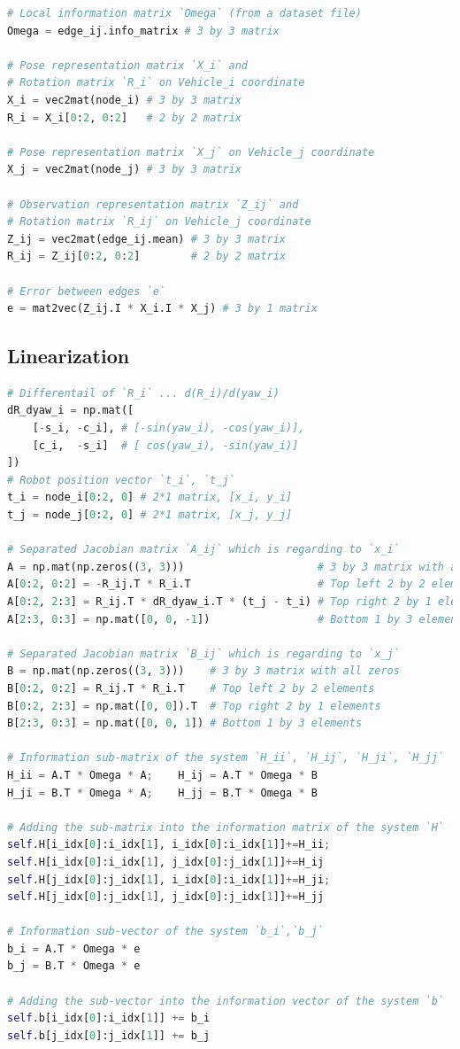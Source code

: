 \documentclass{article}
\begin{document}
\begin{lstlisting}[language=python]
# Local information matrix `Omega` (from a dataset file)
Omega = edge_ij.info_matrix # 3 by 3 matrix

# Pose representation matrix `X_i` and
# Rotation matrix `R_i` on Vehicle_i coordinate
X_i = vec2mat(node_i) # 3 by 3 matrix
R_i = X_i[0:2, 0:2]   # 2 by 2 matrix

# Pose representation matrix `X_j` on Vehicle_j coordinate
X_j = vec2mat(node_j) # 3 by 3 matrix

# Observation representation matrix `Z_ij` and
# Rotation matrix `R_ij` on Vehicle_j coordinate
Z_ij = vec2mat(edge_ij.mean) # 3 by 3 matrix
R_ij = Z_ij[0:2, 0:2]        # 2 by 2 matrix

# Error between edges `e`
e = mat2vec(Z_ij.I * X_i.I * X_j) # 3 by 1 matrix
\end{lstlisting}

\subsection{Linearization}

\begin{lstlisting}[language=python]
# Differentail of `R_i` ... d(R_i)/d(yaw_i)
dR_dyaw_i = np.mat([
    [-s_i, -c_i], # [-sin(yaw_i), -cos(yaw_i)],
    [c_i,  -s_i]  # [ cos(yaw_i), -sin(yaw_i)]
])
# Robot position vector `t_i`, `t_j`
t_i = node_i[0:2, 0] # 2*1 matrix, [x_i, y_i]
t_j = node_j[0:2, 0] # 2*1 matrix, [x_j, y_j]

# Separated Jacobian matrix `A_ij` which is regarding to `x_i`
A = np.mat(np.zeros((3, 3)))                     # 3 by 3 matrix with all zeros
A[0:2, 0:2] = -R_ij.T * R_i.T                    # Top left 2 by 2 elements
A[0:2, 2:3] = R_ij.T * dR_dyaw_i.T * (t_j - t_i) # Top right 2 by 1 elements
A[2:3, 0:3] = np.mat([0, 0, -1])                 # Bottom 1 by 3 elements

# Separated Jacobian matrix `B_ij` which is regarding to `x_j`
B = np.mat(np.zeros((3, 3)))    # 3 by 3 matrix with all zeros
B[0:2, 0:2] = R_ij.T * R_i.T    # Top left 2 by 2 elements
B[0:2, 2:3] = np.mat([0, 0]).T  # Top right 2 by 1 elements
B[2:3, 0:3] = np.mat([0, 0, 1]) # Bottom 1 by 3 elements

# Information sub-matrix of the system `H_ii`, `H_ij`, `H_ji`, `H_jj`
H_ii = A.T * Omega * A;    H_ij = A.T * Omega * B
H_ji = B.T * Omega * A;    H_jj = B.T * Omega * B

# Adding the sub-matrix into the information matrix of the system `H`
self.H[i_idx[0]:i_idx[1], i_idx[0]:i_idx[1]]+=H_ii;
self.H[i_idx[0]:i_idx[1], j_idx[0]:j_idx[1]]+=H_ij
self.H[j_idx[0]:j_idx[1], i_idx[0]:i_idx[1]]+=H_ji;
self.H[j_idx[0]:j_idx[1], j_idx[0]:j_idx[1]]+=H_jj

# Information sub-vector of the system `b_i`,`b_j`
b_i = A.T * Omega * e
b_j = B.T * Omega * e

# Adding the sub-vector into the information vector of the system `b`
self.b[i_idx[0]:i_idx[1]] += b_i
self.b[j_idx[0]:j_idx[1]] += b_j
\end{lstlisting}
\end{document}

